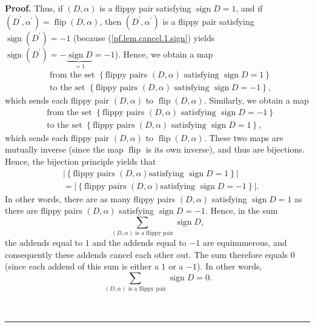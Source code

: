 \documentclass[numbers=enddot,12pt,final,onecolumn,notitlepage]{scrartcl}%
\numberwithin{exer}{subsection}
\theoremstyle{definition}
\newenvironment{proof}[1][Proof]{\noindent\textbf{#1.} }{\ \rule{0.5em}{0.5em}}
\let\sumnonlimits\sum
\renewcommand{\sum}{\sumnonlimits\limits}
\begin{document}
\begin{proof}
Thus, if $\left(  D,\alpha\right)  $ is a flippy pair satisfying
$\operatorname*{sign}D=1$, and if $\left(  D^{\prime},\alpha^{\prime}\right)
=\operatorname*{flip}\left(  D,\alpha\right)  $, then $\left(  D^{\prime
},\alpha^{\prime}\right)  $ is a flippy pair satisfying $\operatorname*{sign}%
\left(  D^{\prime}\right)  =-1$ (because (\ref{pf.lem.cancel.1.sign}) yields
$\operatorname*{sign}\left(  D^{\prime}\right)
=-\underbrace{\operatorname*{sign}D}_{=1}=-1$). Hence, we obtain a map
\begin{align*}
&  \text{from the set }\left\{  \text{flippy pairs }\left(  D,\alpha\right)
\text{ satisfying }\operatorname*{sign}D=1\right\} \\
&  \text{to the set }\left\{  \text{flippy pairs }\left(  D,\alpha\right)
\text{ satisfying }\operatorname*{sign}D=-1\right\}  ,
\end{align*}
which sends each flippy pair $\left(  D,\alpha\right)  $ to
$\operatorname*{flip}\left(  D,\alpha\right)  $. Similarly, we obtain a map
\begin{align*}
&  \text{from the set }\left\{  \text{flippy pairs }\left(  D,\alpha\right)
\text{ satisfying }\operatorname*{sign}D=-1\right\} \\
&  \text{to the set }\left\{  \text{flippy pairs }\left(  D,\alpha\right)
\text{ satisfying }\operatorname*{sign}D=1\right\}  ,
\end{align*}
which sends each flippy pair $\left(  D,\alpha\right)  $ to
$\operatorname*{flip}\left(  D,\alpha\right)  $. These two maps are mutually
inverse (since the map $\operatorname*{flip}$ is its own inverse), and thus
are bijections. Hence, the bijection principle yields that%
\begin{align*}
&  \left\vert \left\{  \text{flippy pairs }\left(  D,\alpha\right)  \text{
satisfying }\operatorname*{sign}D=1\right\}  \right\vert \\
&  =\left\vert \left\{  \text{flippy pairs }\left(  D,\alpha\right)  \text{
satisfying }\operatorname*{sign}D=-1\right\}  \right\vert .
\end{align*}
In other words, there are as many flippy pairs $\left(  D,\alpha\right)  $
satisfying $\operatorname*{sign}D=1$ as there are flippy pairs $\left(
D,\alpha\right)  $ satisfying $\operatorname*{sign}D=-1$. Hence, in the sum%
\[
\sum_{\left(  D,\alpha\right)  \text{ is a flippy pair}}\operatorname*{sign}%
D,
\]
the addends equal to $1$ and the addends equal to $-1$ are equinumerous, and
consequently these addends cancel each other out. The sum therefore equals $0$
(since each addend of this sum is either a $1$ or a $-1$). In other words,%
\begin{equation}
\sum_{\left(  D,\alpha\right)  \text{ is a flippy pair}}\operatorname*{sign}%
D=0. \label{pf.lem.cancel.1.sum-flips}%
\end{equation}



\end{proof}
\end{document}
